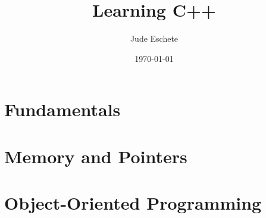\documentclass[12pt,letterpaper]{article}
\title{Learning C++}
\author{Jude Eschete}
\date{\today}
\theoremstyle{definition}
\theoremstyle{remark}
\begin{document}
	
	\maketitle
	\newpage
	\tableofcontents
	\newpage
	
	\part{Fundamentals}
	
	
	\newpage
	
	
	\newpage
	
	
	\newpage
	
	
	\newpage
	
	
	\newpage
	
	
	\newpage
	
	
	\newpage
	
	
	\newpage
	
	\part{Memory and Pointers}
	
	
	\newpage
	
	
	\newpage
	
	\part{Object-Oriented Programming}
	
	
	\newpage
	
	
	\newpage
	
\end{document}
